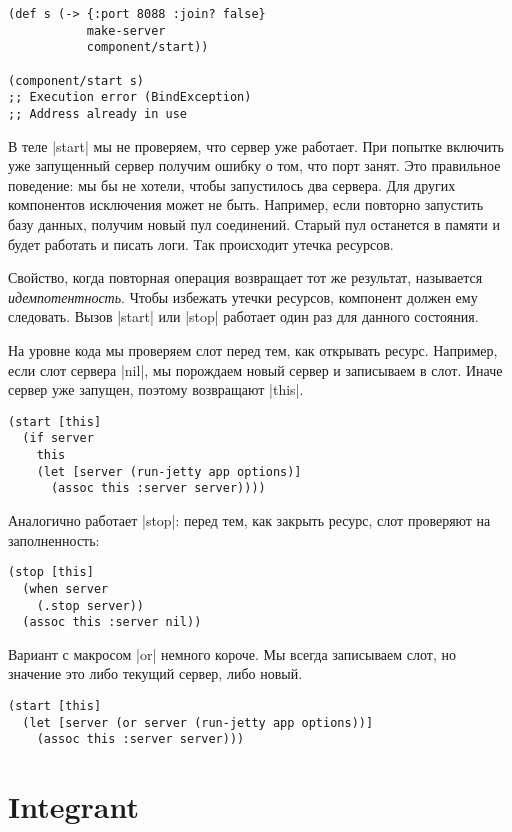 \begin{verbatim}
(def s (-> {:port 8088 :join? false}
           make-server
           component/start))

(component/start s)
;; Execution error (BindException)
;; Address already in use
\end{verbatim}

В теле \spverb|start| мы не проверяем, что сервер уже работает. При попытке
включить уже запущенный сервер получим ошибку о том, что порт занят. Это
правильное поведение: мы бы не хотели, чтобы запустилось два сервера. Для других
компонентов исключения может не быть. Например, если повторно запустить базу
данных, получим новый пул соединений. Старый пул останется в памяти и будет
работать и писать логи. Так происходит утечка ресурсов.

Свойство, когда повторная операция возвращает тот же результат, называется
\emph{идемпотентность}. Чтобы избежать утечки ресурсов, компонент должен ему
следовать. Вызов \spverb|start| или \spverb|stop| работает один раз для данного
состояния.

На уровне кода мы проверяем слот перед тем, как открывать ресурс. Например, если
слот сервера \spverb|nil|, мы порождаем новый сервер и записываем в слот. Иначе
сервер уже запущен, поэтому возвращают \spverb|this|.

\begin{verbatim}
(start [this]
  (if server
    this
    (let [server (run-jetty app options)]
      (assoc this :server server))))
\end{verbatim}

Аналогично работает \spverb|stop|: перед тем, как закрыть ресурс, слот проверяют
на заполненность:

\begin{verbatim}
(stop [this]
  (when server
    (.stop server))
  (assoc this :server nil))
\end{verbatim}

Вариант с макросом \spverb|or| немного короче. Мы всегда записываем слот, но
значение это либо текущий сервер, либо новый.

\begin{verbatim}
(start [this]
  (let [server (or server (run-jetty app options))]
    (assoc this :server server)))
\end{verbatim}

\section{Integrant}

